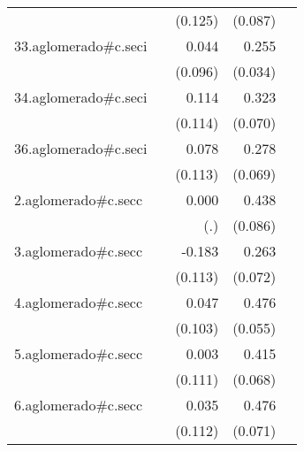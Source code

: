 {\begin{longtable}{l*{4}{D{.}{.}{-1}}}
            &                     &     (0.125)         &     (0.087)         &                     \\
\addlinespace
33.aglomerado#c.seci&                     &       0.044         &       0.255\sym{***}&                     \\
            &                     &     (0.096)         &     (0.034)         &                     \\
\addlinespace
34.aglomerado#c.seci&                     &       0.114         &       0.323\sym{***}&                     \\
            &                     &     (0.114)         &     (0.070)         &                     \\
\addlinespace
36.aglomerado#c.seci&                     &       0.078         &       0.278\sym{***}&                     \\
            &                     &     (0.113)         &     (0.069)         &                     \\
\addlinespace
2.aglomerado#c.secc&                     &       0.000         &       0.438\sym{***}&                     \\
            &                     &         (.)         &     (0.086)         &                     \\
\addlinespace
3.aglomerado#c.secc&                     &      -0.183         &       0.263\sym{***}&                     \\
            &                     &     (0.113)         &     (0.072)         &                     \\
\addlinespace
4.aglomerado#c.secc&                     &       0.047         &       0.476\sym{***}&                     \\
            &                     &     (0.103)         &     (0.055)         &                     \\
\addlinespace
5.aglomerado#c.secc&                     &       0.003         &       0.415\sym{***}&                     \\
            &                     &     (0.111)         &     (0.068)         &                     \\
\addlinespace
6.aglomerado#c.secc&                     &       0.035         &       0.476\sym{***}&                     \\
            &                     &     (0.112)         &     (0.071)         &                     \\

\end{longtable}}
